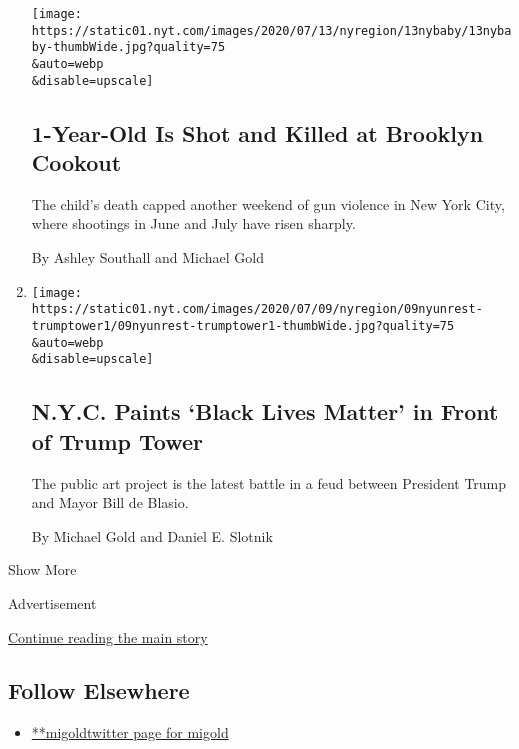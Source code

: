 \begin{enumerate}
  \texttt{[image: https://static01.nyt.com/images/2020/07/13/nyregion/13nybaby/13nybaby-thumbWide.jpg?quality=75\\\&auto=webp\\\&disable=upscale]}

  \hypertarget{1-year-old-is-shot-and-killed-at-brooklyn-cookout}{%
  \subsection{1-Year-Old Is Shot and Killed at Brooklyn
  Cookout}\label{1-year-old-is-shot-and-killed-at-brooklyn-cookout}}

  The child's death capped another weekend of gun violence in New York
  City, where shootings in June and July have risen sharply.

  By Ashley Southall and Michael Gold
\item
  \href{/2020/07/09/nyregion/blm-trump-tower.html}{}

  \texttt{[image: https://static01.nyt.com/images/2020/07/09/nyregion/09nyunrest-trumptower1/09nyunrest-trumptower1-thumbWide.jpg?quality=75\\\&auto=webp\\\&disable=upscale]}

  \hypertarget{nyc-paints-black-lives-matter-in-front-of-trump-tower}{%
  \subsection{N.Y.C. Paints `Black Lives Matter' in Front of Trump
  Tower}\label{nyc-paints-black-lives-matter-in-front-of-trump-tower}}

  The public art project is the latest battle in a feud between
  President Trump and Mayor Bill de Blasio.

  By Michael Gold and Daniel E. Slotnik
\end{enumerate}

Show More

Advertisement

\protect\hyperlink{after-mid2}{Continue reading the main story}

\hypertarget{follow-elsewhere}{%
\subsection{Follow Elsewhere}\label{follow-elsewhere}}

\begin{itemize}
\tightlist
\item
  \href{https://twitter.com/migold}{**migoldtwitter page for migold}
\end{itemize}

